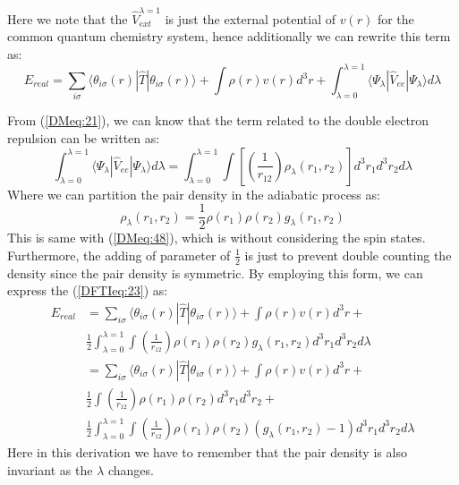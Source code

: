 Here we note that the $\hat{V}^{\lambda=1}_{ext}$ is just the
external potential of $v(r)$ for the common quantum chemistry
system, hence additionally we can rewrite this term as:
\begin{equation}\label{DFTIeq:23}
E_{real} = \sum_{i\sigma}
\langle\theta_{i\sigma}(r)|\hat{T}|\theta_{i\sigma}(r)\rangle +
\int\rho(r)v(r)d^{3}r + \int^{\lambda = 1}_{\lambda =
0}\langle\Psi_{\lambda}|\hat{V}_{ee} |\Psi_{\lambda}\rangle d\lambda
\end{equation}

From (\ref{DMeq:21}), we can know that the term related to the
double electron repulsion can be written as:
\begin{equation}\label{}
\int^{\lambda = 1}_{\lambda = 0}\langle\Psi_{\lambda}|\hat{V}_{ee}
|\Psi_{\lambda}\rangle d\lambda = \int^{\lambda = 1}_{\lambda =
0}\int \left[\left(\frac{1}{r_{12}}\right)
    \rho_{\lambda}(r_{1}, r_{2})\right]d^{3}r_{1}d^{3}r_{2}d\lambda
\end{equation}
Where we can partition the pair density in the adiabatic process as:
\begin{equation}\label{}
\rho_{\lambda}(r_{1}, r_{2}) =
\frac{1}{2}\rho(r_{1})\rho(r_{2})g_{\lambda}(r_{1}, r_{2})
\end{equation}
This is same with (\ref{DMeq:48}), which is without considering the
spin states. Furthermore, the adding of parameter of $\frac{1}{2}$
is just to prevent double counting the density since the pair
density is symmetric. By employing this form, we can express the
(\ref{DFTIeq:23}) as:
\begin{align}\label{DFTIeq:24}
E_{real} &= \sum_{i\sigma}
\langle\theta_{i\sigma}(r)|\hat{T}|\theta_{i\sigma}(r)\rangle +
\int\rho(r)v(r)d^{3}r + \nonumber \\
&\frac{1}{2}\int^{\lambda = 1}_{\lambda = 0} \int
\left(\frac{1}{r_{12}}\right)
\rho(r_{1})\rho(r_{2})g_{\lambda}(r_{1}, r_{2})d^{3}r_{1}d^{3}r_{2}
d\lambda \nonumber \\
&= \sum_{i\sigma}
\langle\theta_{i\sigma}(r)|\hat{T}|\theta_{i\sigma}(r)\rangle +
\int\rho(r)v(r)d^{3}r + \nonumber \\
&\frac{1}{2}\int \left(\frac{1}{r_{12}}\right)
\rho(r_{1})\rho(r_{2})d^{3}r_{1}d^{3}r_{2}
+ \nonumber \\
&\frac{1}{2}\int^{\lambda = 1}_{\lambda = 0} \int
\left(\frac{1}{r_{12}}\right)
\rho(r_{1})\rho(r_{2})(g_{\lambda}(r_{1},
r_{2})-1)d^{3}r_{1}d^{3}r_{2} d\lambda
\end{align}
Here in this derivation we have to remember that the pair density is
also invariant as the $\lambda$ changes.

